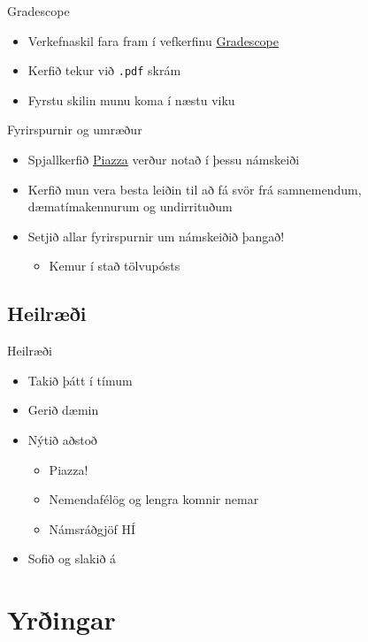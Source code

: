 \documentclass{beamer}
\begin{document}
\begin{frame}{Gradescope}
\begin{itemize}
 \item Verkefnaskil fara fram í vefkerfinu \href{https://gradescope.com/}{Gradescope}
 \item Kerfið tekur við \texttt{.pdf} skrám
 \item Fyrstu skilin munu koma í næstu viku
\end{itemize}
\end{frame}

\begin{frame}{Fyrirspurnir og umræður}
\label{frame:piazza}
\begin{itemize}
 \item Spjallkerfið \href{piazza.com/hi.is/fall2016/tl105g}{Piazza} verður notað í þessu námskeiði
 \item Kerfið mun vera besta leiðin til að fá svör frá samnemendum, dæmatímakennurum og undirrituðum
 \item Setjið allar fyrirspurnir um námskeiðið þangað!
 \begin{itemize}
  \item Kemur í stað tölvupósts
 \end{itemize}
\end{itemize}
\end{frame}

\subsection{Heilræði}

\begin{frame}{Heilræði}
\pause
\begin{itemize}
 \item Takið þátt í tímum\pause
 \item Gerið dæmin \pause
 \item Nýtið aðstoð 
 \begin{itemize}
  \item Piazza!
  \item Nemendafélög og lengra komnir nemar
  \item Námsráðgjöf HÍ \pause
 \end{itemize}
 \item Sofið og slakið á
\end{itemize}
\end{frame}

\section{Yrðingar}
\end{document}
